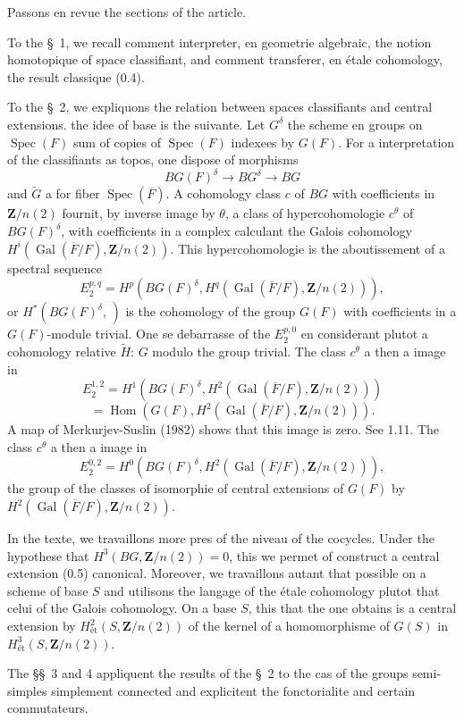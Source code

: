 \documentclass[11pt,a4paper]{article}
\theoremstyle{plain}
\theoremstyle{definition}
\DeclareMathOperator{\Gal}{Gal}
\DeclareMathOperator{\Spec}{Spec}
\DeclareMathOperator{\Hom}{Hom}
\newcommand{\et}{\text{\'et}}
\begin{document}
Passons en revue the sections of the article.

To the \S~1, we recall comment interpreter, en geometrie algebraic, the notion homotopique of space classifiant, and comment transferer, en étale cohomology, the result classique (0.4).

To the \S~2, we expliquons the relation between spaces classifiants and central extensions. the idee of base is the suivante. Let $G^\delta$ the scheme en groups on $\Spec(F)$ sum of copies of $\Spec(F)$ indexees by $G(F)$. For a interpretation of the classifiants as topos, one dispose of morphisms
\[
BG(F)^\delta \to BG^\delta \to BG
\]
and $\widetilde{G}$ a for fiber $\Spec(\overline{F})$. A cohomology class $c$ of $BG$ with coefficients in $\mathbf{Z}/n(2)$ fournit, by inverse image by $\theta$, a class of hypercohomologie $c^\theta$ of $BG(F)^\delta$, with coefficients in a complex calculant the Galois cohomology $H^i(\Gal(\overline{F}/F), \mathbf{Z}/n(2))$. This hypercohomologie is the aboutissement of a spectral sequence
\[
E_2^{p,q} = H^p(BG(F)^\delta, H^q(\Gal(\overline{F}/F), \mathbf{Z}/n(2))),
\]
or $H^*(BG(F)^\delta, \,)$ is the cohomology of the group $G(F)$ with coefficients in a $G(F)$-module trivial. One se debarrasse of the $E_2^{p,0}$ en considerant plutot a cohomology relative $\widetilde{H}$: $G$ modulo the group trivial. The class $c^\theta$ a then a image in
\[
E_2^{1,2} = H^1(BG(F)^\delta, H^2(\Gal(\overline{F}/F), \mathbf{Z}/n(2)))
\]
\[
= \Hom(G(F), H^2(\Gal(\overline{F}/F), \mathbf{Z}/n(2))).
\]
A map of Merkurjev-Suslin (1982) shows that this image is zero. See 1.11. The class $c^\theta$ a then a image in
\[
E_2^{0,2} = H^0(BG(F)^\delta, H^2(\Gal(\overline{F}/F), \mathbf{Z}/n(2))),
\]
the group of the classes of isomorphie of central extensions of $G(F)$ by $H^2(\Gal(\overline{F}/F), \mathbf{Z}/n(2))$.

In the texte, we travaillons more pres of the niveau of the cocycles. Under the hypothese that $H^3(BG, \mathbf{Z}/n(2)) = 0$, this we permet of construct a central extension (0.5) canonical. Moreover, we travaillons autant that possible on a scheme of base $S$ and utilisons the langage of the étale cohomology plutot that celui of the Galois cohomology. On a base $S$, this that the one obtains is a central extension by $H^2_\et(S, \mathbf{Z}/n(2))$ of the kernel of a homomorphisme of $G(S)$ in $H^3_\et(S, \mathbf{Z}/n(2))$.

The \S\S\ 3 and 4 appliquent the results of the \S~2 to the cas of the groups semi-simples simplement connected and explicitent the fonctorialite and certain commutateurs.
\end{document}
